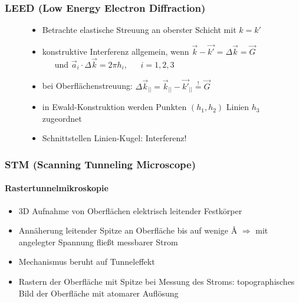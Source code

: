 \documentclass{beamer}
\begin{document}
\begin{frame}
\frametitle{LEED (Low Energy Electron Diffraction)}
\begin{figure}[H]
\begin{minipage}[b]{0.45\textwidth}
		\begin{itemize}
 		\item Betrachte elastische Streuung an oberster Schicht mit $k=k'$
 	 	\item konstruktive Interferenz allgemein, wenn $\vec{k}-\vec{k'}=\Delta \vec{k}=\vec{G}$~~~und
 	 	$\vec{a}_i\cdot \Delta \vec{k}=2\pi h_i,~~~~~~~i=1, 2, 3$
 	 	\item bei Oberflächenstreuung: $\Delta\vec{k}_{||}=\vec{k}_{||}-\vec{k'}_{||}\overset{!}{=} \vec{G}$
 	 	\item in Ewald-Konstruktion werden Punkten $(h_1, h_2)$ Linien $h_3$ zugeordnet
 	 	\item Schnittstellen Linien-Kugel: Interferenz!
		\end{itemize}
	\end{minipage}
	\hspace{0.4cm}
	\begin{minipage}[b]{0.45\textwidth}
		
	\end{minipage}
\end{figure}
\end{frame}




\begin{frame}
\frametitle{STM (Scanning Tunneling Microscope)}
\framesubtitle{Rastertunnelmikroskopie}
\begin{itemize}\setlength{\itemsep}{+15pt}
  \item 3D Aufnahme von Oberflächen elektrisch leitender Festkörper
  \item Annäherung leitender Spitze an Oberfläche bis auf wenige {\AA} $\Rightarrow$ mit angelegter
  Spannung fließt messbarer Strom
  \item Mechanismus beruht auf Tunneleffekt
  \item Rastern der Oberfläche mit Spitze bei Messung des Stroms: topographisches Bild der
  Oberfläche mit atomarer Auflösung
\end{itemize}
\end{frame}
\end{document}
